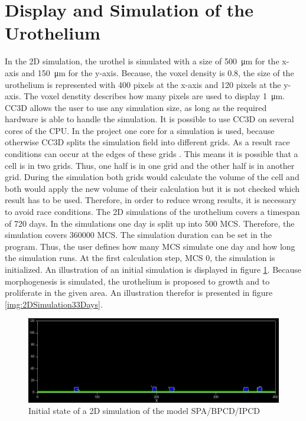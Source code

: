 \section{Display and Simulation of the Urothelium}
In the 2D simulation, the urothel is simulated with a size of \SI{500}{\micro\metre} for the x-axis and \SI{150}{\micro\metre} for the y-axis. Because, the voxel density is $0.8$, the size of the urothelium is represented with 400 pixels at the x-axis and 120 pixels at the y-axis. The voxel denstity describes how many pixels are used to display \SI{1}{\micro\metre}. \ac{CC3D} allows the user to use any simulation size, as long as the required hardware is able to handle the simulation. \newline
It is possible to use \ac{CC3D} on several cores of the CPU. In the project one core for a simulation is used, because otherwise \ac{CC3D} splits the simulation field into different grids. As a result race conditions can occur at the edges of these grids \cite{MaciejH.Swat2017}. This means it is possible that a cell is in two grids. Thus, one half is in one grid and the other half is in another grid. During the simulation both grids would calculate the volume of the cell and both would apply the new volume of their calculation but it is not checked which result has to be used. Therefore, in order to reduce wrong results, it is necessary to avoid race conditions. \newline 
The 2D simulations of the urothelium covers a timespan of 720 days. In the simulations one day is split up into 500 \ac{MCS}. Therefore, the simulation covers 360000 \ac{MCS}. The simulation duration can be set in the program. Thus, the user defines how many \ac{MCS} simulate one day and how long the simulation runs. At the first calculation step, \ac{MCS} 0, the simulation is initialized. An illustration of an initial simulation is displayed in figure \ref{img:2DSimulationInitialState}. Because morphogenesis is simulated, the urothelium is proposed to growth and to proliferate in the given area. An illustration therefor is presented in figure \ref{img:2DSimulation33Days}.

\begin{figure}[ht]
	\center
	\includegraphics[scale=0.35]{figures/2DSimulation-InitialState.png}
	\caption{Initial state of a 2D simulation of the model SPA/BPCD/IPCD}
	\label{img:2DSimulationInitialState}
\end{figure}

